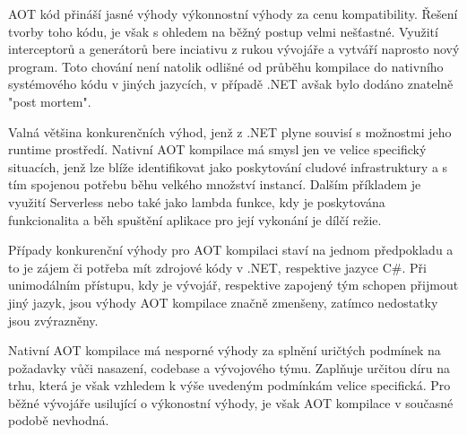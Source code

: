 

AOT kód přináší jasné výhody výkonnostní výhody za cenu kompatibility. Řešení tvorby toho kódu, je však s ohledem na běžný postup velmi nešťastné. Využití interceptorů a generátorů bere inciativu z rukou vývojáře a vytváří naprosto nový program. Toto chování není natolik odlišné od průběhu kompilace do nativního systémového kódu v jiných jazycích, v případě .NET avšak bylo dodáno znatelně "post mortem".

Valná většina konkurenčních výhod, jenž z .NET plyne souvisí s možnostmi jeho runtime prostředí. Nativní AOT kompilace má smysl jen ve velice specifický situacích, jenž lze blíže identifikovat jako poskytování cludové infrastruktury a s tím spojenou potřebu běhu velkého množství instancí. Dalším příkladem je využití Serverless nebo také jako lambda funkce, kdy je poskytována funkcionalita a běh spuštění aplikace pro její vykonání je dílčí režie.

Případy konkurenční výhody pro AOT kompilaci staví na jednom předpokladu a to je zájem či potřeba mít zdrojové kódy v .NET, respektive jazyce C\#. Při unimodálním přístupu, kdy je vývojář, respektive zapojený tým schopen přijmout jiný jazyk, jsou výhody AOT kompilace značně zmenšeny, zatímco nedostatky jsou zvýrazněny.

Nativní AOT kompilace má nesporné výhody za splnění uričtých podmínek na požadavky vůči nasazení, codebase a vývojového týmu. Zaplňuje určitou díru na trhu, která je však vzhledem k výše uvedeným podmínkám velice specifická. Pro běžné vývojáře usilující o výkonostní výhody, je však AOT kompilace v současné podobě nevhodná.
